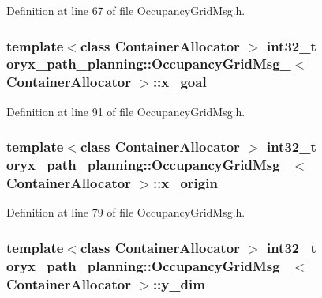 \-Definition at line 67 of file \-Occupancy\-Grid\-Msg.\-h.

\subsubsection[{x\-\_\-goal}]{\setlength{\rightskip}{0pt plus 5cm}template$<$class Container\-Allocator $>$ int32\-\_\-t {\bf oryx\-\_\-path\-\_\-planning\-::\-Occupancy\-Grid\-Msg\-\_\-}$<$ \-Container\-Allocator $>$\-::{\bf x\-\_\-goal}}\label{structoryx__path__planning_1_1OccupancyGridMsg___a73dbb38e12b13da2de68a89c50317426}


\-Definition at line 91 of file \-Occupancy\-Grid\-Msg.\-h.

\subsubsection[{x\-\_\-origin}]{\setlength{\rightskip}{0pt plus 5cm}template$<$class Container\-Allocator $>$ int32\-\_\-t {\bf oryx\-\_\-path\-\_\-planning\-::\-Occupancy\-Grid\-Msg\-\_\-}$<$ \-Container\-Allocator $>$\-::{\bf x\-\_\-origin}}\label{structoryx__path__planning_1_1OccupancyGridMsg___a7380dfa3e2f923e793b43f7b36a6b104}


\-Definition at line 79 of file \-Occupancy\-Grid\-Msg.\-h.

\subsubsection[{y\-\_\-dim}]{\setlength{\rightskip}{0pt plus 5cm}template$<$class Container\-Allocator $>$ int32\-\_\-t {\bf oryx\-\_\-path\-\_\-planning\-::\-Occupancy\-Grid\-Msg\-\_\-}$<$ \-Container\-Allocator $>$\-::{\bf y\-\_\-dim}}\label{structoryx__path__planning_1_1OccupancyGridMsg___a879b788ce9d0312d7da0628d503cbe7b}


